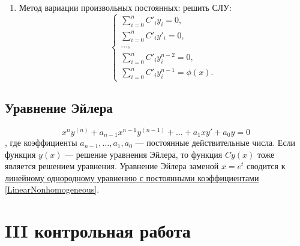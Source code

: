 \documentclass[a5paper,10pt]{article}
\begin{document}
\begin{enumerate}
\begin{enumerate}
						\item Метод вариации произвольных постоянных: решить СЛУ:
							\begin{equation*}
								\begin{cases}
									\sum\limits^n_{i=0}C\prime_i y_i = 0,\\
									\sum\limits^n_{i=0}C\prime_i y\prime_i = 0,\\
									\ldots,\\
									\sum\limits^n_{i=0}C\prime_i y^{n-2}_i = 0,\\
									\sum\limits^n_{i=0}C\prime_i y^{n-1}_i = \phi(x).
								\end{cases}
							\end{equation*}
					\end{enumerate}
			\end{enumerate}

		\subsection{Уравнение Эйлера}
			$$ x^ny^{(n)} + a_{n-1}x^{n-1}y^{(n-1)} + \ldots + a_1xy\prime + a_0y = 0 $$, где коэффициенты $ a_{n-1},\ldots,a_1,a_0 $ — постоянные действительные числа.
			Если функция $y(x)$ — решение уравнения Эйлера, то функция $Cy(x)$ тоже является решением уравнения.
			Уравнение Эйлера заменой $ x = e^t $ сводится к \underline{линейному однородному уравнению с постоянными коэффициентами} \ref{LinearNonhomogeneous}.

		\newpage

	\section{III контрольная работа}
\end{document}
